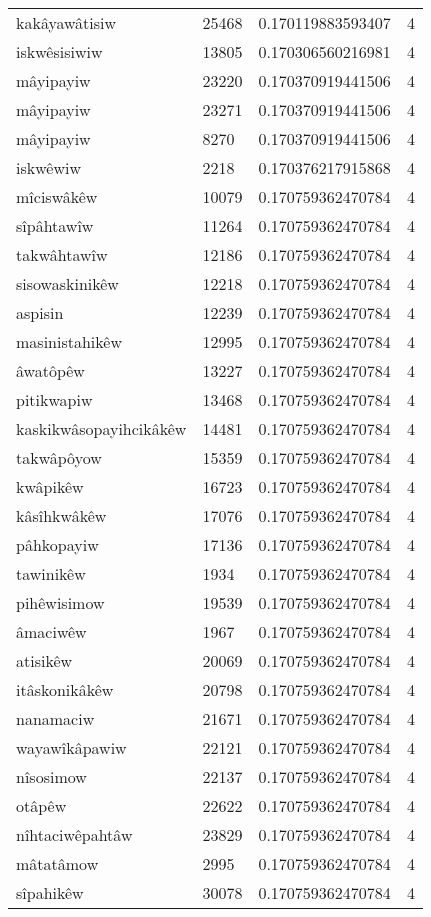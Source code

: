 \begin{longtable}{llll}
kakâyawâtisiw & 25468 & 0.170119883593407 & 4 \\
iskwêsisiwiw & 13805 & 0.170306560216981 & 4 \\
mâyipayiw & 23220 & 0.170370919441506 & 4 \\
mâyipayiw & 23271 & 0.170370919441506 & 4 \\
mâyipayiw & 8270 & 0.170370919441506 & 4 \\
iskwêwiw & 2218 & 0.170376217915868 & 4 \\
mîciswâkêw & 10079 & 0.170759362470784 & 4 \\
sîpâhtawîw & 11264 & 0.170759362470784 & 4 \\
takwâhtawîw & 12186 & 0.170759362470784 & 4 \\
sisowaskinikêw & 12218 & 0.170759362470784 & 4 \\
aspisin & 12239 & 0.170759362470784 & 4 \\
masinistahikêw & 12995 & 0.170759362470784 & 4 \\
âwatôpêw & 13227 & 0.170759362470784 & 4 \\
pitikwapiw & 13468 & 0.170759362470784 & 4 \\
kaskikwâsopayihcikâkêw & 14481 & 0.170759362470784 & 4 \\
takwâpôyow & 15359 & 0.170759362470784 & 4 \\
kwâpikêw & 16723 & 0.170759362470784 & 4 \\
kâsîhkwâkêw & 17076 & 0.170759362470784 & 4 \\
pâhkopayiw & 17136 & 0.170759362470784 & 4 \\
tawinikêw & 1934 & 0.170759362470784 & 4 \\
pihêwisimow & 19539 & 0.170759362470784 & 4 \\
âmaciwêw & 1967 & 0.170759362470784 & 4 \\
atisikêw & 20069 & 0.170759362470784 & 4 \\
itâskonikâkêw & 20798 & 0.170759362470784 & 4 \\
nanamaciw & 21671 & 0.170759362470784 & 4 \\
wayawîkâpawiw & 22121 & 0.170759362470784 & 4 \\
nîsosimow & 22137 & 0.170759362470784 & 4 \\
otâpêw & 22622 & 0.170759362470784 & 4 \\
nîhtaciwêpahtâw & 23829 & 0.170759362470784 & 4 \\
mâtatâmow & 2995 & 0.170759362470784 & 4 \\
sîpahikêw & 30078 & 0.170759362470784 & 4 \\

\end{longtable}
